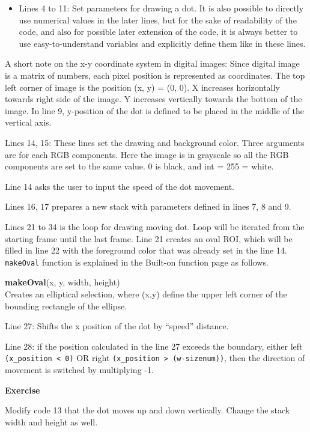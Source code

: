 \documentclass[11pt,a4paper,oneside]{report}
\newenvironment{indentexercise}[1]%
{{\setlength{\leftmargin}{2em}}%
\textbf{Exercise \thesubsection-#1}%
\begin{list}{}%
	\item%
}
{\end{list}}
\newenvironment{indentCom}%
{\begin{list}{}%
         {\setlength{\leftmargin}{1em}}%
         \item[]%
}
{\end{list}}
\newcommand{\ilcom}[1]{\texttt{\small#1}}
\begin{document}
\begin{itemize}
\item Lines 4 to 11: Set parameters for drawing a dot. It is also possible to directly use numerical values in the later lines, but for the sake of readability of the code, and also for possible later extension of the code, it is always better to use easy-to-understand variables and explicitly define them like in these lines. 
\end{itemize}
A short note on the x-y coordinate system in digital images: Since digital image is a matrix of numbers, each pixel position is represented as coordinates. The top left corner of image is the position (x, y) = (0, 0). X increases horizontally towards right side of the image. Y increases vertically towards the bottom of the image.  In line 9, y-position of the dot is defined to be placed in the middle of the vertical axis. 
\begin{itemize}
\item Lines 14, 15: These lines set the drawing and background color. Three arguments are for each RGB components. Here the image is in grayscale so all the RGB components are set to the same value. 0 is black, and int = 255 = white.
\item Line 14 asks the user to input the speed of the dot movement.
\item Lines 16, 17 prepares a new stack with parameters defined in lines 7, 8 and 9.
\item Lines 21 to 34 is the loop for drawing moving dot. Loop will be iterated from the starting frame until the last frame. Line 21 creates an oval ROI, which will be filled in line 22 with the foreground color that was already set in the line 14. \ilcom{makeOval} function is explained in the Built-on function page as follows.

\begin{indentCom}
\textbf{makeOval}(x, y, width, height)\\
Creates an elliptical selection, where (x,y) define the upper left corner of the bounding rectangle of the ellipse. 
\end{indentCom}
\item Line 27: Shifts the x position of the dot by ``speed'' distance. 
\item Line 28: if the position calculated in the line 27 exceeds the boundary, either left \ilcom{(x\_position < 0)} OR right \ilcom{(x\_position > (w-sizenum))}, then the direction of movement is switched by multiplying -1.
\end{itemize}
\begin{indentexercise}{2}
Modify code 13 that the dot moves up and down vertically. Change the stack width and height as well. 
\end{indentexercise}
\end{document}
